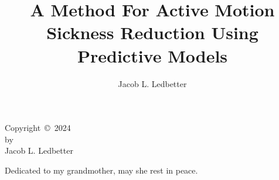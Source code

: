 \documentclass{wit-thesis}
\author{Jacob L. Ledbetter}
\title{A Method For Active Motion Sickness Reduction Using Predictive Models}
\begin{document}
\maketitle

\makesignature

\begin{copyrightpage}
  Copyright~\copyright~2024\\
  by\\
  Jacob L. Ledbetter
\end{copyrightpage}


% 
\begin{dedication}
  \vspace{3in}
  \centering
  Dedicated to my grandmother, may she rest in peace.
\end{dedication}


% 


\begin{abstract}
  
\end{abstract}


\tableofcontents
\end{document}
